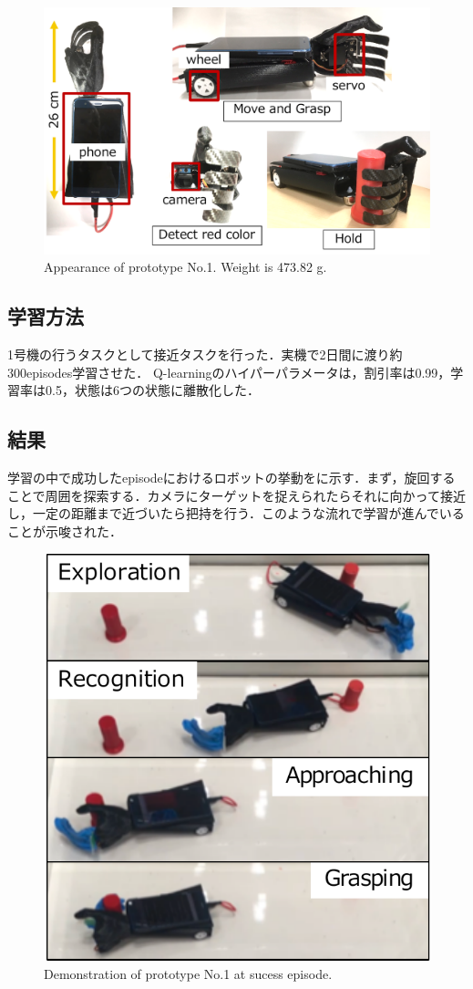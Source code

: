 \begin{figure}
    \centering
    \includegraphics[width=\linewidth]{figure/chapter3/1号機外観}
    \caption[Appearance of Prototype No.1]{Appearance of prototype No.1. Weight is 473.82 g.}
    \label{fig:1号機外観}
\end{figure}


\subsection{学習方法}
1号機の行うタスクとして接近タスクを行った．実機で2日間に渡り約300episodes学習させた．
Q-learningのハイパーパラメータは，割引率は0.99，学習率は0.5，状態は6つの状態に離散化した．


\subsection{結果}
学習の中で成功したepisodeにおけるロボットの挙動をに示す．まず，旋回することで周囲を探索する．カメラにターゲットを捉えられたらそれに向かって接近し，一定の距離まで近づいたら把持を行う．このような流れで学習が進んでいることが示唆された．

\begin{figure}[H]
    \centering
    \includegraphics[width=0.7\linewidth]{figure/chapter3/robothand-v1_demo}
    \caption{Demonstration of prototype No.1 at sucess episode.}
    \label{fig:1号機例}
\end{figure}

